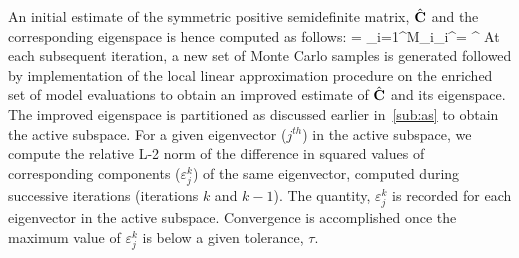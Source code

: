 An initial estimate of the symmetric positive semidefinite matrix, $\hat{\mathbf{{C}}}$ 
and the corresponding eigenspace is hence computed as follows:
%
\be
{} = \sum\limits_{i=1}^{M}_i_i^\top = \hat{\bm{\Lambda}}^\top
\ee
%
At each subsequent iteration, a new set of Monte Carlo samples is generated followed by implementation of the
 local linear approximation procedure on the enriched set of model evaluations to obtain an improved estimate of
 $\hat{\mathbf{{C}}}$ and its eigenspace. The improved eigenspace is partitioned as discussed earlier in~\ref{sub:as}
 to obtain the active subspace. For a given eigenvector ($j^{th}$) in the active subspace, we compute the relative L-2 
 norm of the difference in squared values of corresponding components ($\varepsilon_j^k$) of the same eigenvector,
 computed during successive iterations (iterations $k$ and $k-1$). The quantity, $\varepsilon_j^k$ is recorded for
 each eigenvector in the active subspace. Convergence is accomplished once the maximum value of $\varepsilon_j^k$
 is below a given tolerance, $\tau$.
 





